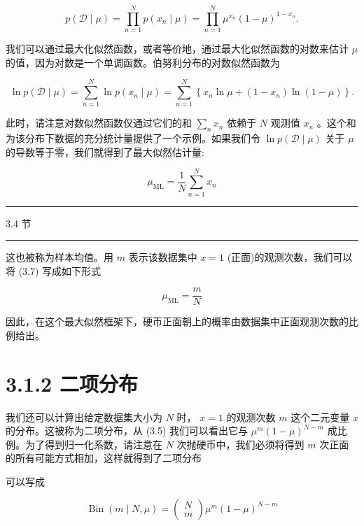 \documentclass[10pt]{article}
\newcommand{\HRule}{\begin{center}\rule{0.9\linewidth}{0.2mm}\end{center}}
\begin{document}
\[
p\left( {\mathcal{D} \mid  \mu }\right)  = \mathop{\prod }\limits_{{n = 1}}^{N}p\left( {{x}_{n} \mid  \mu }\right)  = \mathop{\prod }\limits_{{n = 1}}^{N}{\mu }^{{x}_{n}}{\left( 1 - \mu \right) }^{1 - {x}_{n}}. \tag{3.5}
\]

我们可以通过最大化似然函数，或者等价地，通过最大化似然函数的对数来估计 \(\mu\) 的值，因为对数是一个单调函数。伯努利分布的对数似然函数为

\[
\ln p\left( {\mathcal{D} \mid  \mu }\right)  = \mathop{\sum }\limits_{{n = 1}}^{N}\ln p\left( {{x}_{n} \mid  \mu }\right)  = \mathop{\sum }\limits_{{n = 1}}^{N}\left\{  {{x}_{n}\ln \mu  + \left( {1 - {x}_{n}}\right) \ln \left( {1 - \mu }\right) }\right\}  . \tag{3.6}
\]

此时，请注意对数似然函数仅通过它们的和 \(\mathop{\sum }\limits_{n}{x}_{n}\) 依赖于 \(N\) 观测值 \({x}_{n}\) 。这个和为该分布下数据的充分统计量提供了一个示例。如果我们令 \(\ln p\left( {\mathcal{D} \mid  \mu }\right)\) 关于 \(\mu\) 的导数等于零，我们就得到了最大似然估计量:

\[
{\mu }_{\mathrm{{ML}}} = \frac{1}{N}\mathop{\sum }\limits_{{n = 1}}^{N}{x}_{n} \tag{3.7}
\]

\HRule

3.4 节

\HRule

这也被称为样本均值。用 \(m\) 表示该数据集中 \(x = 1\) (正面)的观测次数，我们可以将 (3.7) 写成如下形式

\[
{\mu }_{\mathrm{{ML}}} = \frac{m}{N} \tag{3.8}
\]

因此，在这个最大似然框架下，硬币正面朝上的概率由数据集中正面观测次数的比例给出。

\section*{3.1.2 二项分布}

我们还可以计算出给定数据集大小为 \(N\) 时， \(x = 1\) 的观测次数 \(m\) 这个二元变量 \(x\) 的分布。这被称为二项分布，从 (3.5) 我们可以看出它与 \({\mu }^{m}{\left( 1 - \mu \right) }^{N - m}\) 成比例。为了得到归一化系数，请注意在 \(N\) 次抛硬币中，我们必须将得到 \(m\) 次正面的所有可能方式相加，这样就得到了二项分布

可以写成

\[
\operatorname{Bin}\left( {m \mid  N,\mu }\right)  = \left( \begin{array}{l} N \\  m \end{array}\right) {\mu }^{m}{\left( 1 - \mu \right) }^{N - m} \tag{3.9}
\]
\end{document}
